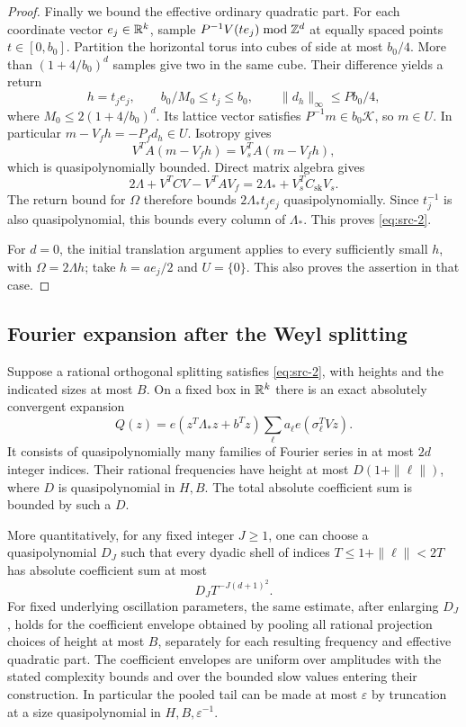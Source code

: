\begin{proof}
Finally we bound the effective ordinary quadratic part.
For each coordinate vector \(e_j\in\mathbb R^k\), sample
\(P^{-1}V(te_j)\bmod\mathbb Z^d\) at equally spaced points
\(t\in[0,b_0]\).  Partition the horizontal torus into cubes of side
at most \(b_0/4\).  More than \((1+4/b_0)^d\) samples give two in the
same cube.  Their difference yields a return
\[
 h=t_je_j,\qquad b_0/M_0\le t_j\le b_0,\qquad
 \|d_h\|_\infty\le Pb_0/4,
\]
where \(M_0\le2(1+4/b_0)^d\).  Its lattice vector satisfies
\(P^{-1}m\in b_0\mathcal K\), so \(m\in U\).
In particular
\(m-V_fh=-P_fd_h\in U\).
Isotropy gives
\[
 V^TA(m-V_fh)=V_s^TA(m-V_fh),
\]
which is quasipolynomially bounded.  Direct matrix algebra gives
\[
 2\Lambda+V^TCV-V^TAV_f
       =2\Lambda_*+V_s^TC_{\mathrm{sk}}V_s .
\]
The return bound for \(\Omega\) therefore bounds
\(2\Lambda_*t_je_j\) quasipolynomially.  Since \(t_j^{-1}\) is also
quasipolynomial, this bounds every column of \(\Lambda_*\).
This proves \eqref{eq:src-2}.

For \(d=0\), the initial translation argument applies to every
sufficiently small \(h\), with \(\Omega=2\Lambda h\); take
\(h=ae_j/2\) and \(U=\{0\}\).  This also proves the assertion in that
case.
\end{proof}

\subsection{Fourier expansion after the Weyl splitting}

\begin{lemma}\label{lem:chart-expansion}
Suppose a rational orthogonal splitting satisfies
\eqref{eq:src-2}, with heights and the indicated sizes at most \(B\).
On a fixed box in \(\mathbb R^k\) there is an exact absolutely convergent
expansion
\begin{equation*}
 Q(z)=e(z^T\Lambda_*z+b^Tz)
                \sum_\ell a_\ell e(\sigma_\ell^TVz).
 \tag{3}\label{eq:src-3}
\end{equation*}
It consists of quasipolynomially many families of Fourier series in
at most \(2d\) integer indices.  Their rational frequencies have height
at most \(D(1+\|\ell\|)\), where \(D\) is quasipolynomial in \(H,B\).
The total absolute coefficient sum is bounded by such a \(D\).

More quantitatively, for any fixed integer \(J\ge1\), one can choose
a quasipolynomial \(D_J\) such that every dyadic shell of indices
\(T\le1+\|\ell\|<2T\) has absolute coefficient sum at most
\[
 D_J T^{-J(d+1)^2}.
\]
For fixed underlying oscillation parameters, the same estimate, after
enlarging \(D_J\), holds for the coefficient envelope obtained by pooling
all rational projection choices of height at most \(B\), separately
for each resulting frequency and effective quadratic part.  The
coefficient envelopes are uniform over amplitudes with the stated
complexity bounds and over the bounded slow values entering their
construction.  In particular the pooled tail can be made at most
\(\varepsilon\) by truncation at a size quasipolynomial in
\(H,B,\varepsilon^{-1}\).
\end{lemma}

